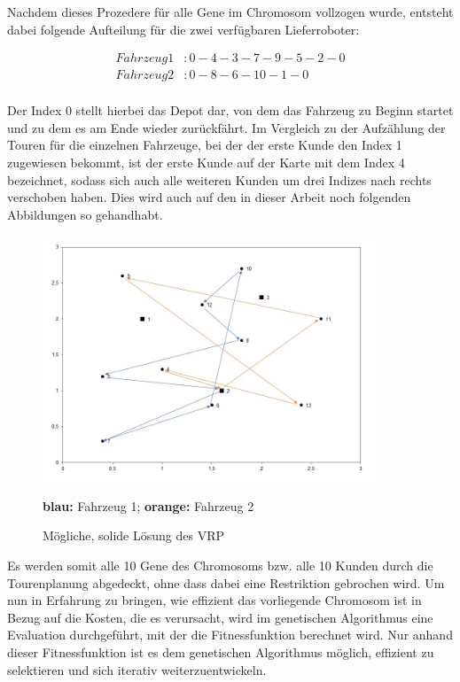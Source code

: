 \documentclass[a4paper,12pt,parskip,bibtotoc,liststotoc]{article}
\begin{document}
Nachdem dieses Prozedere für alle Gene im Chromosom vollzogen wurde, entsteht dabei folgende Aufteilung für die zwei verfügbaren Lieferroboter: 


\begin{equation} \label{eq:test}
    \begin{aligned} 
         Fahrzeug 1&: 0 - 4 - 3 - 7 - 9 - 5 - 2 - 0 \\
        Fahrzeug 2&: 0 - 8 - 6 - 10 - 1 - 0\\
    \end{aligned}
\end{equation}




Der Index 0 stellt hierbei das Depot dar, von dem das Fahrzeug zu Beginn startet und zu dem es am Ende wieder zurückfährt. Im Vergleich zu der Aufzählung der Touren für die einzelnen Fahrzeuge, bei der der erste Kunde den Index 1 zugewiesen bekommt, ist der erste Kunde auf der Karte mit dem Index 4 bezeichnet, sodass sich auch alle weiteren Kunden um drei Indizes nach rechts verschoben haben. 
Dies wird auch auf den in dieser Arbeit noch folgenden Abbildungen so gehandhabt.




\begin{figure}[h!]
  \begin{center}
    \includegraphics[width=100mm]{vrp11.jpg}
    \caption{Mögliche, solide Lösung des VRP}  \label{Typen}
    {\footnotesize \textbf{blau:} Fahrzeug 1;  \textbf{orange:} Fahrzeug 2}
  \end{center}
\end{figure}

Es werden somit alle 10 Gene des Chromosoms bzw. alle 10 Kunden durch die Tourenplanung abgedeckt, ohne dass dabei eine Restriktion gebrochen wird.
Um nun in Erfahrung zu bringen, wie effizient das vorliegende Chromosom ist in Bezug auf die Kosten, die es verursacht, wird im genetischen Algorithmus eine Evaluation durchgeführt, mit der die Fitnessfunktion berechnet wird. 
Nur anhand dieser Fitnessfunktion ist es dem genetischen Algorithmus möglich, effizient zu selektieren und sich iterativ weiterzuentwickeln.
\end{document}
